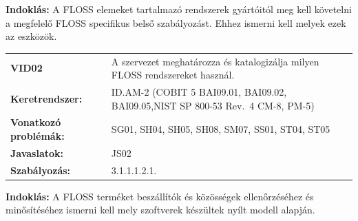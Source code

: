 \documentclass[12pt,magyar,a4paper,oneside]{scrreprt}
\begin{document}
\textbf{Indoklás: } A FLOSS elemeket tartalmazó rendszerek gyártóitól
meg kell követelni a megfelelő FLOSS specifikus belső szabályozást.
Ehhez ismerni kell melyek ezek az eszközök.

\begin{longtable}[]{@{}ll@{}}
\toprule
\endhead
\begin{minipage}[t]{0.16\columnwidth}\raggedright
\textbf{VID02}\strut
\end{minipage} & \begin{minipage}[t]{0.79\columnwidth}\raggedright
A szervezet meghatározza és katalogizálja milyen FLOSS rendszereket
használ.\strut
\end{minipage}\tabularnewline
\begin{minipage}[t]{0.16\columnwidth}\raggedright
\textbf{Keretrendszer:}\strut
\end{minipage} & \begin{minipage}[t]{0.79\columnwidth}\raggedright
ID.AM-2 (COBIT 5 BAI09.01, BAI09.02, BAI09.05,NIST SP 800-53 Rev.~4
CM-8, PM-5)\strut
\end{minipage}\tabularnewline
\begin{minipage}[t]{0.16\columnwidth}\raggedright
\textbf{Vonatkozó problémák:}\strut
\end{minipage} & \begin{minipage}[t]{0.79\columnwidth}\raggedright
SG01, SH04, SH05, SH08, SM07, SS01, ST04, ST05\strut
\end{minipage}\tabularnewline
\begin{minipage}[t]{0.16\columnwidth}\raggedright
\textbf{Javaslatok:}\strut
\end{minipage} & \begin{minipage}[t]{0.79\columnwidth}\raggedright
JS02\strut
\end{minipage}\tabularnewline
\begin{minipage}[t]{0.16\columnwidth}\raggedright
\textbf{Szabályozás:}\strut
\end{minipage} & \begin{minipage}[t]{0.79\columnwidth}\raggedright
3.1.1.1.2.1.\strut
\end{minipage}\tabularnewline
\bottomrule
\end{longtable}

\textbf{Indoklás: } A FLOSS terméket beszállítók és közösségek
ellenőrzéséhez és minősítéséhez ismerni kell mely szoftverek készültek
nyílt modell alapján.
\end{document}
